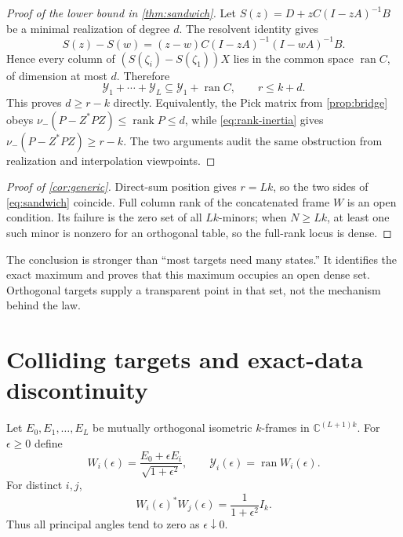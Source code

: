 \documentclass[11pt]{article}
\theoremstyle{definition}
\theoremstyle{remark}
\newcommand{\C}{\mathbb C}
\newcommand{\rank}{\operatorname{rank}}
\newcommand{\ran}{\operatorname{ran}}
\newcommand{\nminus}{\nu_{-}}
\begin{document}
\begin{proof}[Proof of the lower bound in \cref{thm:sandwich}]
Let $S(z)=D+zC(I-zA)^{-1}B$ be a minimal realization of degree $d$.
The resolvent identity gives
\[
 S(z)-S(w)=(z-w)C(I-zA)^{-1}(I-wA)^{-1}B.
\]
Hence every column of $(S(\zeta_i)-S(\zeta_1))X$ lies in the common space
$\ran C$, of dimension at most $d$.  Therefore
\[
 \mathcal Y_1+\cdots+\mathcal Y_L
 \subseteq \mathcal Y_1+\ran C,
 \qquad r\le k+d.
\]
This proves $d\ge r-k$ directly.  Equivalently, the Pick matrix from
\cref{prop:bridge} obeys
$\nminus(P-Z^*PZ)\le\rank P\le d$, while
\eqref{eq:rank-inertia} gives
$\nminus(P-Z^*PZ)\ge r-k$.  The two arguments audit the same obstruction
from realization and interpolation viewpoints.
\end{proof}

\begin{proof}[Proof of \cref{cor:generic}]
Direct-sum position gives $r=Lk$, so the two sides of
\eqref{eq:sandwich} coincide.  Full column rank of the concatenated frame
$W$ is an open condition.  Its failure is the zero set of all $Lk$-minors;
when $N\ge Lk$, at least one such minor is nonzero for an orthogonal table,
so the full-rank locus is dense.
\end{proof}

The conclusion is stronger than ``most targets need many states.''  It
identifies the exact maximum and proves that this maximum occupies an open
dense set.  Orthogonal targets supply a transparent point in that set, not
the mechanism behind the law.

\section{Colliding targets and exact-data discontinuity}\label{sec:collision}

Let $E_0,E_1,\ldots,E_L$ be mutually orthogonal isometric $k$-frames in
$\C^{(L+1)k}$.  For $\epsilon\ge0$ define
\begin{equation}\label{eq:collision-family}
 W_i(\epsilon)=\frac{E_0+\epsilon E_i}{\sqrt{1+\epsilon^2}},
 \qquad \mathcal Y_i(\epsilon)=\ran W_i(\epsilon).
\end{equation}
For distinct $i,j$,
\begin{equation}\label{eq:collision-overlap}
 W_i(\epsilon)^*W_j(\epsilon)=\frac{1}{1+\epsilon^2}I_k.
\end{equation}
Thus all principal angles tend to zero as $\epsilon\downarrow0$.
\end{document}
